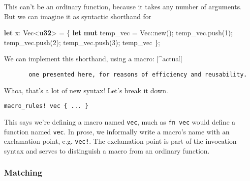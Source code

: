 \documentclass[a4paper,]{book}
\newenvironment{Shaded}{\begin{snugshade}}{\end{snugshade}}
\newcommand{\KeywordTok}[1]{\textcolor[rgb]{0.13,0.29,0.53}{\textbf{{#1}}}}
\newcommand{\DecValTok}[1]{\textcolor[rgb]{0.00,0.00,0.81}{{#1}}}
\newcommand{\OtherTok}[1]{\textcolor[rgb]{0.56,0.35,0.01}{{#1}}}
\newcommand{\NormalTok}[1]{{#1}}
\begin{document}
This can't be an ordinary function, because it takes any number of
arguments. But we can imagine it as syntactic shorthand for

\begin{Shaded}
\begin{Highlighting}[]
\KeywordTok{let} \NormalTok{x: Vec<}\KeywordTok{u32}\NormalTok{> = \{}
    \KeywordTok{let} \KeywordTok{mut} \NormalTok{temp_vec = Vec::new();}
    \NormalTok{temp_vec.push(}\DecValTok{1}\NormalTok{);}
    \NormalTok{temp_vec.push(}\DecValTok{2}\NormalTok{);}
    \NormalTok{temp_vec.push(}\DecValTok{3}\NormalTok{);}
    \NormalTok{temp_vec}
\NormalTok{\};}
\end{Highlighting}
\end{Shaded}

We can implement this shorthand, using a macro: {[}\^{}actual{]}

\begin{verbatim}
       one presented here, for reasons of efficiency and reusability.
\end{verbatim}

\begin{Shaded}
\end{Shaded}

Whoa, that's a lot of new syntax! Let's break it down.

\begin{verbatim}
macro_rules! vec { ... }
\end{verbatim}

This says we're defining a macro named \texttt{vec}, much as
\texttt{fn\ vec} would define a function named \texttt{vec}. In prose,
we informally write a macro's name with an exclamation point, e.g.
\texttt{vec!}. The exclamation point is part of the invocation syntax
and serves to distinguish a macro from an ordinary function.

\subsubsection{Matching}\label{matching}
\end{document}
